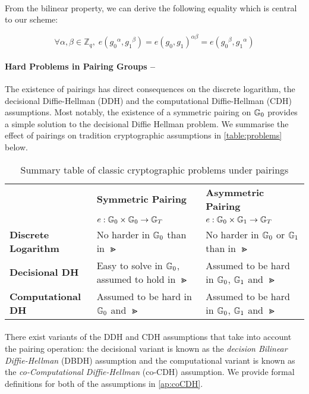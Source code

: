 \paragraph{} From the bilinear property, we can derive the following equality which is central to our scheme:

\begin{equation}
	\label{eq:pairing}
	\forall \alpha, \beta \in \mathbb{Z}_q, \; e({g_0}^\alpha, {g_1}^\beta) = e({g_0}, {g_1})^{\alpha\beta} =e({g_0}^\beta, {g_1}^\alpha)
\end{equation}

\paragraph{Hard Problems in Pairing Groups --} The existence of pairings has direct consequences on the discrete logarithm, the decisional Diffie-Hellman (DDH) and the computational Diffie-Hellman (CDH) assumptions. Most notably, the existence of a symmetric pairing on $\mathbb{G}_0$ provides a simple solution to the decisional Diffie Hellman problem. We summarise the effect of pairings on tradition cryptographic assumptions in \autoref{table:problems} below.

\begin{table}[H]
	\begin{center}
  		\begin{tabularx}{\linewidth}{l|X|X}
    			& \textbf{Symmetric Pairing} & \textbf{Asymmetric Pairing} \\
    			& $e : \mathbb{G}_0 \times \mathbb{G}_0 \rightarrow \mathbb{G}_T $ & $e : \mathbb{G}_0 \times \mathbb{G}_1 \rightarrow \mathbb{G}_T $\\
    		\hline
    		\textbf{Discrete Logarithm} & No harder in $\mathbb{G}_0$ than in $\Gt$& No harder in $\mathbb{G}_0$ or $\mathbb{G}_1$ than in $\Gt$ \\
    		\hline
    		\textbf{Decisional DH}& Easy to solve in $\mathbb{G}_0$, assumed to hold in $\Gt$& Assumed to be hard in $\mathbb{G}_0$, $\mathbb{G}_1$ and $\Gt$\\
    		\hline
    		\textbf{Computational DH} & Assumed to be hard in $\mathbb{G}_0$ and $\Gt$ & Assumed to be hard in $\mathbb{G}_0$, $\mathbb{G}_1$ and $\Gt$
  		\end{tabularx}
  		\caption{Summary table of classic cryptographic problems under pairings}
  		\label{table:problems}
  \end{center}
\end{table}

\paragraph{} There exist variants of the DDH and CDH assumptions that take into account the pairing operation: the decisional variant is known as the \textit{decision Bilinear Diffie-Hellman} (DBDH) assumption and the computational variant is known as the \textit{co-Computational Diffie-Hellman} (co-CDH) assumption. We provide formal definitions for both of the assumptions in \autoref{ap:coCDH}.

